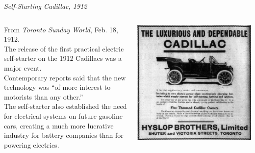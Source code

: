 \documentclass[aspectratio=169]{beamer}
\begin{document}
\begin{frame}{\it Self-Starting Cadillac, 1912}
  \begin{columns}
    From \textit{Toronto Sunday World}, Feb. 18, 1912.\\
    The release of the first practical electric self-starter on the 1912 Cadillacs was a major event.\\
    Contemporary reports said that the new technology was “of more interest to motorists than any other.”\\
    The self-starter also established the need for electrical systems on future gasoline cars, creating a much more lucrative industry for battery companies than for powering electrics.

    \vspace{1em}
    \begin{center}
      \includegraphics[width=0.75\linewidth]{media/caddilac.png} %
    \end{center}
  \end{columns}
\end{frame}

\end{document}

